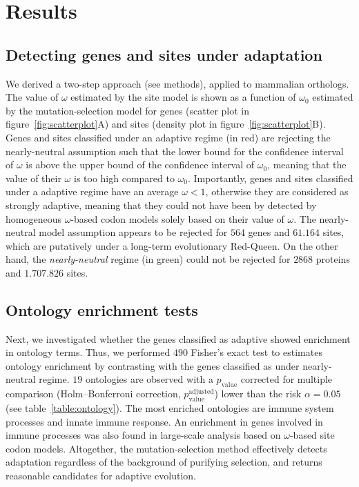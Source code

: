 \documentclass{article}
\begin{document}
\section*{Results}\label{sec:results}

\subsection*{Detecting genes and sites under adaptation}

We derived a two-step approach (see methods), applied to mammalian orthologs.
The value of $\omega$ estimated by the site model is shown as a function of $\omega_{0}$ estimated by the mutation-selection model for genes (scatter plot in figure~\ref{fig:scatterplot}A) and sites (density plot in figure~\ref{fig:scatterplot}B).
Genes and sites classified under an adaptive regime (in red) are rejecting the nearly-neutral assumption such that the lower bound for the confidence interval of $\omega$ is above the upper bound of the confidence interval of $\omega_{0}$, meaning that the value of their $\omega$ is too high compared to $\omega_{0}$.
Importantly, genes and sites classified under a adaptive regime have an average $\omega < 1$, otherwise they are considered as strongly adaptive, meaning that they could not have been by detected by homogeneous $\omega$-based codon models solely based on their value of $\omega$.
The nearly-neutral model assumption appears to be rejected for $564$ genes and $61.164$ sites, which are putatively under a long-term evolutionary Red-Queen.
On the other hand, the \textit{nearly-neutral} regime (in green) could not be rejected for $2868$ proteins and $1.707.826$ sites.

\subsection*{Ontology enrichment tests}

Next, we investigated whether the genes classified as adaptive showed enrichment in ontology terms.
Thus, we performed $490$ Fisher's exact test to estimates ontology enrichment by contrasting with the genes classified as under nearly-neutral regime.
$19$ ontologies are observed with a $p_{\mathrm{value}}$ corrected for multiple comparison (Holm–Bonferroni correction, $p_{\mathrm{value}}^{\mathrm{adjusted}}$) lower than the risk $\alpha=0.05$ (see table~\ref{table:ontology}).
The most enriched ontologies are immune system processes and innate immune response.
An enrichment in genes involved in immune processes was also found in large-scale analysis based on $\omega$-based site codon models\cite{kosiol_patterns_2008}.
Altogether, the mutation-selection method effectively detects adaptation regardless of the background of purifying selection, and returns reasonable candidates for adaptive evolution.
\end{document}
